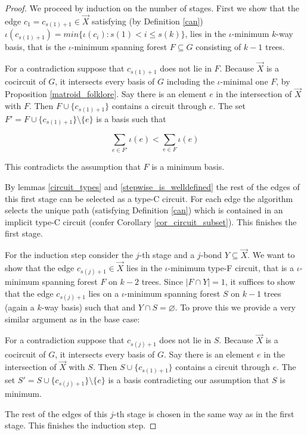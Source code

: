 \begin{proof}
	We proceed by induction on the number of stages. First we show that the edge $c_1 = c_{s(1)+1} \in \vec X$ satisfying (by Definition \ref{can}) $\iota(c_{s(1)+1}) = min\{ \iota(c_i) : s(1) < i \leq s(k) \}$, lies in the $\iota$-minimum $k$-way basis, that is the $\iota$-minimum spanning forest $F \subseteq G$ consisting of $k-1$ trees.

\clearpage

	For a contradiction suppose that $c_{s(1)+1}$ does not lie in $F$. Because $\vec X$ is a cocircuit of $G$, it intersects every basis of $G$ including the $\iota$-minimal one $F$, by Proposition \ref{matroid_folklore}. Say there is an element $e$ in the intersection of $\vec X$ with $F$. Then $F \cup \{c_{s(1)+1}\}$ contains a circuit through $e$. The set $F' = F \cup \{c_{s(1)+1}\} \setminus \{e\}$ is a basis such that

\[
	\sum_{e \in F'} \iota(e) < \sum_{e \in F} \iota(e)
\]

This contradicts the assumption that $F$ is a minimum basis.

	By lemmas \ref{circuit_types} and \ref{stepwise_is_welldefined} the rest of the edges of this first stage can be selected as a type-C circuit. For each edge the algorithm selects the unique path (satisfying Definition \ref{can}) which is contained in an implicit type-C circuit (confer Corollary \ref{cor_circuit_subset}). This finishes the first stage.

	For the induction step consider the $j$-th stage and a $j$-bond $Y \subseteq \vec X$. We want to show that the edge $c_{s(j)+1} \in \vec X$ lies in the $\iota$-minimum type-F circuit, that is a $\iota$-minimum spanning forest $F$ on $k-2$ trees. Since $\lvert F \cap Y \rvert = 1$, it suffices to show that the edge $c_{s(j)+1}$ lies on a $\iota$-minimum spanning forest $S$ on $k-1$ trees (again a $k$-way basis) such that and $Y \cap S = \varnothing$. To prove this we provide a very similar argument as in the base case:

	For a contradiction suppose that $c_{s(j)+1}$ does not lie in $S$. Because $\vec X$ is a cocircuit of $G$, it intersects every basis of $G$. Say there is an element $e$ in the intersection of $\vec X$ with $S$. Then $S \cup \{c_{s(1)+1}\}$ contains a circuit through $e$. The set $S' = S \cup \{c_{s(j)+1}\} \setminus \{e\}$ is a basis contradicting our assumption that $S$ is minimum.


	The rest of the edges of this $j$-th stage is chosen in the same way as in the first stage. This finishes the induction step.
\end{proof}

